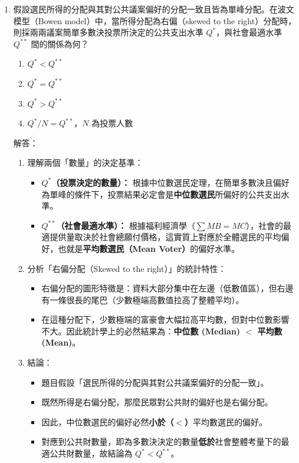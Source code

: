 \documentclass[12pt, a4paper]{article}
\begin{document}
\begin{enumerate}
    \newpage

    \item 假設選民所得的分配與其對公共議案偏好的分配一致且皆為單峰分配。在波文模型（Bowen model）中，當所得分配為右偏（skewed to the right）分配時，則採兩兩議案簡單多數決投票所決定的公共支出水準 \(Q^*\)，與社會最適水準 \(Q^{**}\) 間的關係為何？
    \begin{enumerate}[label=\Alph*.]
        \item \(Q^* < Q^{**}\)
        \item \(Q^* = Q^{**}\)
        \item \(Q^* > Q^{**}\)
        \item \(Q^* / N = Q^{**}\)，\(N\) 為投票人數
    \end{enumerate}
    解答：
    \begin{enumerate}[label=\textbf{\arabic*.}]
    \item 理解兩個「數量」的決定基準：
    \begin{itemize}
        \item \textbf{\(Q^*\)（投票決定的數量）：} 根據中位數選民定理，在簡單多數決且偏好為單峰的條件下，投票結果必定會是\textbf{中位數選民}所偏好的公共支出水準。
        \item \textbf{\(Q^{**}\)（社會最適水準）：} 根據福利經濟學（\(\sum MB = MC\)），社會的最適提供量取決於社會總願付價格，這實質上對應於全體選民的平均偏好，也就是\textbf{平均數選民（Mean Voter）}的偏好水準。
    \end{itemize}

    \item 分析「右偏分配（Skewed to the right）」的統計特性：
    \begin{itemize}
        \item 右偏分配的圖形特徵是：資料大部分集中在左邊（低數值區），但右邊有一條很長的尾巴（少數極端高數值拉高了整體平均）。
        \item 在這種分配下，少數極端的富豪會大幅拉高平均數，但對中位數影響不大。因此統計學上的必然結果為：\textbf{中位數 (Median) \(<\) 平均數 (Mean)}。
    \end{itemize}

    \item 結論：
    \begin{itemize}
        \item 題目假設「選民所得的分配與其對公共議案偏好的分配一致」。
        \item 既然所得是右偏分配，那麼民眾對公共財的偏好也是右偏分配。
        \item 因此，中位數選民的偏好必然\textbf{小於（\(<\)）}平均數選民的偏好。
        \item 對應到公共財數量，即為多數決決定的數量\textbf{低於}社會整體考量下的最適公共財數量，故結論為 \textbf{\(Q^* < Q^{**}\)}。
    \end{itemize}
\end{enumerate}


\end{enumerate}
\end{document}
